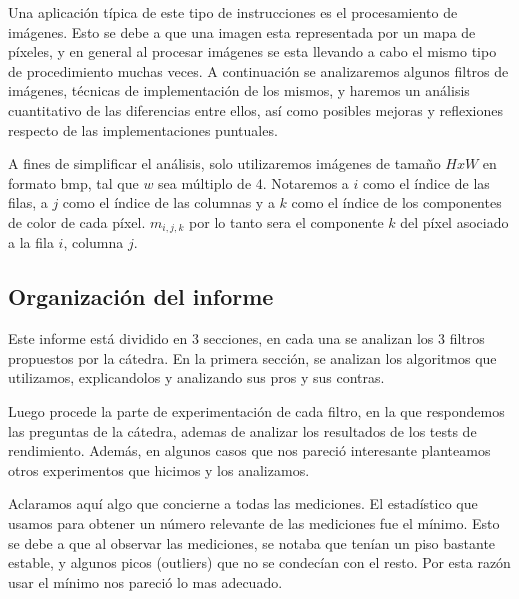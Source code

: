Una aplicación típica de este tipo de instrucciones es el procesamiento de imágenes. Esto se debe a que una imagen esta representada por un mapa de píxeles, y en general al procesar imágenes se esta llevando a cabo el mismo tipo de procedimiento muchas veces. A continuación se analizaremos algunos filtros de imágenes, técnicas de implementación de los mismos, y haremos un análisis cuantitativo de las diferencias entre ellos, así como posibles mejoras y reflexiones respecto de las implementaciones puntuales.

A fines de simplificar el análisis, solo utilizaremos imágenes de tamaño $HxW$ en formato bmp, tal que $w$ sea múltiplo de 4. Notaremos a $i$ como el índice de las filas, a $j$ como el índice de las columnas y a $k$ como el índice de los componentes de color de cada píxel. $m_{i, j, k}$ por lo tanto sera el componente $k$ del píxel asociado a la fila $i$, columna $j$.


\subsection{Organización del informe}

Este informe está dividido en 3 secciones, en cada una se analizan los 3 filtros propuestos por la cátedra. En la primera sección, se analizan los algoritmos que utilizamos, explicandolos y analizando sus pros y sus contras. 

Luego procede la parte de experimentación de cada filtro, en la que respondemos las preguntas de la cátedra, ademas de analizar los resultados de los tests de rendimiento. Además, en algunos casos que nos pareció interesante planteamos otros experimentos que hicimos y los analizamos.


Aclaramos aquí algo que concierne a todas las mediciones. El estadístico que usamos para obtener un número relevante de las mediciones fue el mínimo. Esto se debe a que al observar las mediciones, se notaba que tenían un piso bastante estable, y algunos picos (outliers) que no se condecían con el resto.
Por esta razón usar el mínimo nos pareció lo mas adecuado.

